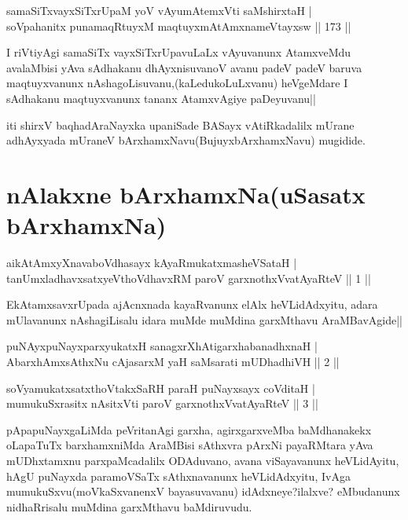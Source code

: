 
\begin{shl}
samaSiTxvayxSiTxrUpaM yoV vAyumAtemxVti saMshirxtaH |\\
soV\s pahanitx punamaqRtuyxM maqtuyxmAtAmxnameVtayxsw \hfill || 173 ||
\end{shl}

\begin{artha}
I riVtiyAgi samaSiTx vayxSiTxrUpavuLaLx vAyuvanunx AtamxveMdu avalaMbisi yAva sAdhakanu dhAyxnisuvanoV avanu padeV padeV baruva maqtuyxvanunx nAshagoLisuvanu,(kaLedukoLuLxvanu) heVgeMdare I sAdhakanu maqtuyxvanunx tananx AtamxvAgiye paDeyuvanu||
\end{artha}

\begin{center}
iti shirxV baqhadAraNayxka upaniSade BASayx vAtiRkadalilx mUrane adhAyxyada mUraneV bArxhamxNavu(BujuyxbArxhamxNavu) mugidide.
\end{center}

\section*{nAlakxne bArxhamxNa(uSasatx bArxhamxNa)}

\begin{shl}
aikAtAmxyXnavaboVdhasayx kAyaRmukatxmasheVSataH |\\
tanUmxladhavxsatxyeV\s thoVdhavxRM paroV garxnothxV\s vatAyaRteV \hfill || 1 ||
\end{shl}

\begin{artha}
EkAtamxsavxrUpada ajAcnxnada kayaRvanunx elAlx heVLidAdxyitu, adara mUlavanunx nAshagiLisalu idara muMde muMdina garxMthavu AraMBavAgide||
\end{artha}

\begin{shl}
puNAyxpuNayxparxyukatxH sanagxrXhAtigarxhabanadhxnaH |\\
AbarxhAmx\s \s sAthxNu cAjasarxM yaH saMsarati mUDhadhiVH \hfill || 2 ||
\end{shl}

\begin{shl}
soV\s yamukatxsatxthoVtakxSaRH paraH puNayxsayx coVditaH |\\
mumukuSxrasitx nAsitxVti paroV garxnothxV\s vatAyaRteV \hfill || 3 ||
\end{shl}

\begin{artha}
pApapuNayxgaLiMda peVritanAgi garxha, agirxgarxveMba baMdhanakekx oLapaTuTx barxhamxniMda AraMBisi sAthxvra pArxNi payaRMtara yAva mUDhxtamxnu parxpaMcadalilx ODAduvano, avana viSayavanunx heVLidAyitu, hAgU puNayxda paramoVSaTx sAthxnavanunx heVLidAdxyitu, IvAga mumukuSxvu(moVkaSxvanenxV bayasuvavanu) idAdxneye?ilalxve? eMbudanunx nidhaRrisalu muMdina garxMthavu baMdiruvudu.
\end{artha}

